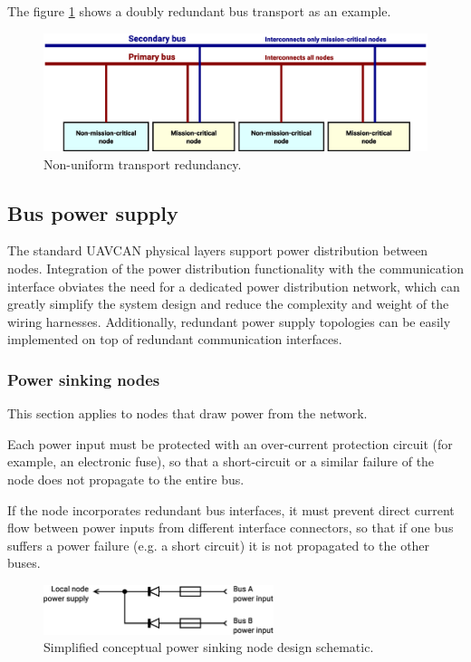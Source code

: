 The figure \ref{fig:phy_non_uniform_transport_redundancy} shows a doubly redundant bus transport as an example.

\begin{figure}[H]
    \centering
	\includegraphics[width=\textwidth]{physical_layer/non_uniform_bus_redundancy}
	\caption{Non-uniform transport redundancy.\label{fig:phy_non_uniform_transport_redundancy}}
\end{figure}

\subsection{Bus power supply}

The standard UAVCAN physical layers support power distribution between nodes.
Integration of the power distribution functionality with the communication interface
obviates the need for a dedicated power distribution network,
which can greatly simplify the system design and reduce the complexity and weight of the wiring harnesses.
Additionally, redundant power supply topologies can be easily implemented on top of redundant communication interfaces.

\subsubsection{Power sinking nodes}

This section applies to nodes that draw power from the network.

Each power input must be protected with an over-current protection circuit (for example, an electronic fuse),
so that a short-circuit or a similar failure of the node does not propagate to the entire bus.

If the node incorporates redundant bus interfaces,
it must prevent direct current flow between power inputs from different interface connectors,
so that if one bus suffers a power failure (e.g. a short circuit) it is not propagated to the other buses.

\begin{figure}[H]
    \centering
	\includegraphics[width=0.6\textwidth]{physical_layer/redundant_bus_power_sink}
	\caption{Simplified conceptual power sinking node design schematic.\label{fig:phy_redundant_bus_power_sink}}
\end{figure}

